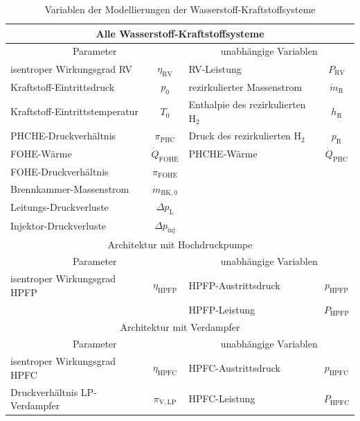\begin{table}[ht]
    \centering
	\caption{Variablen der Modellierungen der Wasserstoff-Kraftstoffsysteme}
	\begin{tabular} {|l|c|l|c|} \hline%
    \multicolumn{4}{|c}{Alle Wasserstoff-Kraftstoffsysteme}\\ \hline
    \multicolumn{2}{|c}{Parameter} & \multicolumn{2}{|c|}{unabhängige Variablen}\\ \hline\hline%
    isentroper Wirkungsgrad RV & $\eta_\mathrm{RV}$ & RV-Leistung & $P_{\mathrm{RV}}$ \\ \hline
    Kraftstoff-Eintrittsdruck & $p_0$ & rezirkulierter Massenstrom & $\dot{m}_\mathrm{R}$ \\ \hline
    Kraftstoff-Eintrittstemperatur & $T_0$ & Enthalpie des rezirkulierten H$_2$ & $h_\mathrm{R}$ \\ \hline
    PHCHE-Druckverhältnis  & $\pi_{\mathrm{PHC}}$ & Druck des rezirkulierten H$_2$ & $p_\mathrm{R}$\\ \hline
    FOHE-Wärme & $\dot{Q}_{\mathrm{FOHE}}$ & PHCHE-Wärme  & $\dot{Q}_{\mathrm{PHC}}$\\ \hline
    FOHE-Druckverhältnis & $\pi_{\mathrm{FOHE}}$ & \multicolumn{2}{c|}{}\\ \hline
    Brennkammer-Massenstrom & $\dot{m}_{\mathrm{BK},0}$ & \multicolumn{2}{c|}{}\\ \hline
    Leitungs-Druckverluste & $\Delta p_{\mathrm{L}}$ & \multicolumn{2}{c|}{}\\ \hline
    Injektor-Druckverluste & $\Delta p_{\mathrm{inj}}$ & \multicolumn{2}{c|}{}\\ \hline\hline
	\multicolumn{4}{|c|}{Architektur mit Hochdruckpumpe}\\ \hline
    \multicolumn{2}{|c}{Parameter} & \multicolumn{2}{|c|}{unabhängige Variablen}\\ \hline\hline%
    isentroper Wirkungsgrad HPFP & $\eta_{\mathrm{HPFP}}$ & HPFP-Austrittsdruck & $p_{\mathrm{HPFP}}$ \\ \hline
    & & HPFP-Leistung & $P_{\mathrm{HPFP}}$ \\ \hline\hline
    \multicolumn{4}{|c|}{Architektur mit Verdampfer}\\ \hline
    \multicolumn{2}{|c}{Parameter} & \multicolumn{2}{|c|}{unabhängige Variablen}\\ \hline\hline%
    isentroper Wirkungsgrad HPFC & $\eta_{\mathrm{HPFC}}$ & HPFC-Austrittsdruck & $p_{\mathrm{HPFC}}$ \\ \hline
    Druckverhältnis LP-Verdampfer & $\pi_{\mathrm{V,LP}}$ & HPFC-Leistung & $P_{\mathrm{HPFC}}$ \\ \hline

\end{tabular}
\end{table}
